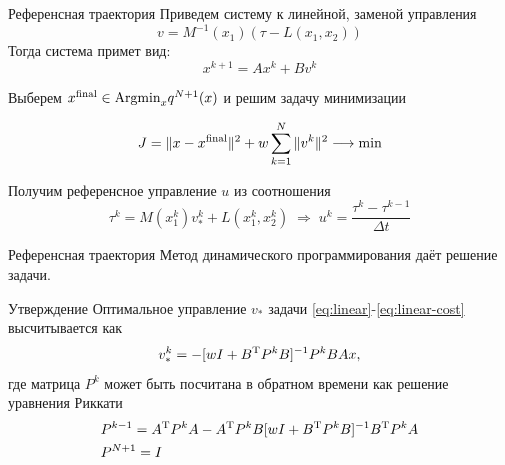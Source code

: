     \begin{frame}{Референсная траектория}
        Приведем систему к линейной, заменой управления
        $$
            v = M^{-1}(x_1)(\tau - L(x_1, x_2))
        $$
        Тогда система примет вид:
        \begin{equation}\label{eq:linear}
            x^{k+1} =  A x^{k} + B v^{k}
        \end{equation}

        Выберем $x^{\textnormal{final}} \in \textnormal{Argmin}_{x} q^{N+1}(x)$ и решим задачу минимизации

        \begin{equation}\label{eq:linear-cost}
            J = \| x-x^{\textnormal{final}} \|^2 + w \sum_{k=1}^{N} \| v^k \|^2 \longrightarrow \textnormal{min}
        \end{equation}

        Получим референсное управление $u$ из соотношения
        $$
            \tau^k = M(x_1^k)v^k_* + L(x_1^k,x_2^k) \;\Longrightarrow\; u^{k} = \frac{\tau^{k} - \tau^{k-1}}{\Delta t}
        $$
    \end{frame}

    \begin{frame}{Референсная траектория}
        Метод динамического программирования даёт решение задачи.
        \vfill
        \begin{block}{Утверждение}
            Оптимальное управление $v_*$ задачи \eqref{eq:linear}-\eqref{eq:linear-cost} высчитывается как
            $$
                v^k_* = -[wI + B^{\textnormal{T}}P^kB]^{-1} P^k B A x,
            $$
            где матрица $P^k$ может быть посчитана в обратном времени как решение уравнения Риккати
            $$
                \begin{aligned}
                    &P^{k-1} = A^{\textnormal{T}} P^{k} A - A^{\textnormal{T}} P^k B [wI + B^{\textnormal{T}} P^k B]^{-1} B^{\textnormal{T}} P^{k} A
                    \\
                    &P^{N+1} = I
                \end{aligned}
            $$
        \end{block}
    \end{frame}

